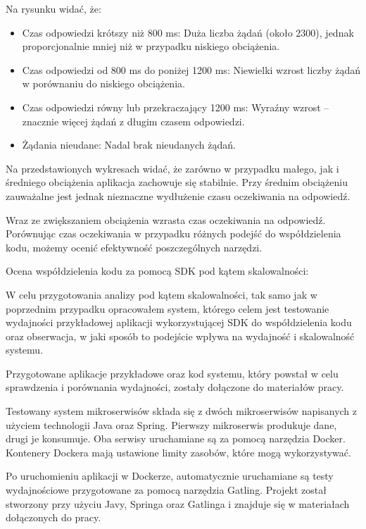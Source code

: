\documentclass[runningheads,12pt]{llncs}
\begin{document}
Na rysunku widać, że:

\begin{itemize}
    \item Czas odpowiedzi krótszy niż 800 ms: Duża liczba żądań (około 2300), jednak proporcjonalnie mniej niż w przypadku niskiego obciążenia.
    \item Czas odpowiedzi od 800 ms do poniżej 1200 ms: Niewielki wzrost liczby żądań w porównaniu do niskiego obciążenia.
    \item Czas odpowiedzi równy lub przekraczający 1200 ms: Wyraźny wzrost – znacznie więcej żądań z długim czasem odpowiedzi.
    \item Żądania nieudane: Nadal brak nieudanych żądań.
\end{itemize}

Na przedstawionych wykresach widać, że zarówno w przypadku małego, jak i średniego obciążenia aplikacja zachowuje się stabilnie. Przy średnim obciążeniu zauważalne jest jednak nieznaczne wydłużenie czasu oczekiwania na odpowiedź.

\newpage

Wraz ze zwiększaniem obciążenia wzrasta czas oczekiwania na odpowiedź. Porównując czas oczekiwania w przypadku różnych podejść do współdzielenia kodu, możemy ocenić efektywność poszczególnych narzędzi.

Ocena współdzielenia kodu za pomocą SDK pod kątem skalowalności:

W celu przygotowania analizy pod kątem skalowalności, tak samo jak w poprzednim przypadku opracowałem system, którego celem jest testowanie wydajności przykładowej aplikacji wykorzystującej SDK do współdzielenia kodu oraz obserwacja, w jaki sposób to podejście wpływa na wydajność i skalowalność systemu.

Przygotowane aplikacje przykładowe oraz kod systemu, który powstał w celu sprawdzenia i porównania wydajności, zostały dołączone do materiałów pracy.

Testowany system mikroserwisów składa się z dwóch mikroserwisów napisanych z użyciem technologii Java oraz Spring. Pierwszy mikroserwis produkuje dane, drugi je konsumuje. Oba serwisy uruchamiane są za pomocą narzędzia Docker. Kontenery Dockera mają ustawione limity zasobów, które mogą wykorzystywać.

Po uruchomieniu aplikacji w Dockerze, automatycznie uruchamiane są testy wydajnościowe przygotowane za pomocą narzędzia Gatling. Projekt został stworzony przy użyciu Javy, Springa oraz Gatlinga i znajduje się w materiałach dołączonych do pracy.
\end{document}
